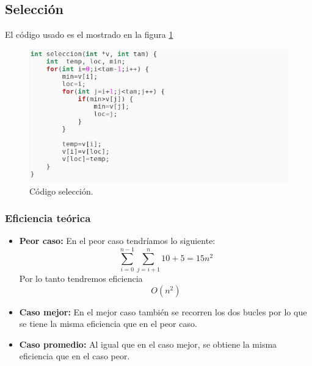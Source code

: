 
\subsection{Selección}
El código usado es el mostrado en la figura  \ref{fig7}

\begin{figure}[H]
        \includegraphics[scale=0.7]{imagenes/seleccion.png}
        \caption{Código selección.}
        \label{fig7}
\end{figure}

\subsubsection{Eficiencia teórica}

\begin{itemize}
  \item \textbf{Peor caso:} En el peor caso tendríamos lo siguiente:
  \begin{equation}
      \sum_{i=0}^{n-1} \sum_{j=i+1}^{n} 10 + 5 = 15n^2
  \end{equation}
  Por lo tanto tendremos eficiencia \begin{equation} O(n^2) \end{equation}
  
  \item \textbf{Caso mejor:} En el mejor caso también se recorren los dos bucles por lo que se tiene la misma eficiencia que en el peor caso.
  \item \textbf{Caso promedio:} Al igual que en el caso mejor, se obtiene la misma eficiencia que en el caso peor.
\end{itemize}

